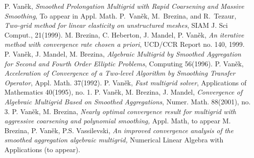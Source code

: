 \documentclass[twoside, 12pt]{article}
\begin{document}
\begin{thebibliography}{10}
{\sc P. Van\v{e}k},
{\em Smoothed Prolongation Multigrid with Rapid Coarsening and Massive
Smoothing},
To appear in Appl. Math.
{\sc P.~Van\v{e}k, M.~Brezina, and R.~Tezaur},
{\em Two-grid method for linear elasticity on unstructured meshes},
SIAM J. Sci Comput., 21(1999).
{\sc M. Brezina, C. Heberton, J. Mandel, P. Van\v{e}k},
{\em An iterative method with convergence rate chosen a priori},
UCD/CCR Report no. 140, 1999.
{\sc P. Van\v{e}k, J. Mandel, M. Brezina},
{\em Algebraic Multigrid by Smoothed Aggregation for Second and Fourth Order
Elliptic Problems},
Computing 56(1996).
{\sc P. Van\v{e}k},
{\em Acceleration of Convergence of a Two-level Algorithm by Smoothing
Transfer Operator},
Appl. Math. 37(1992).
{\sc P. Van\v{e}k},
{\em Fast multigrid solver},
Applications of Mathematics 40(1995), no. 1.
{\sc P. Van\v{e}k, M. Brezina, J. Mandel},
{\em Convergence of Algebraic Multigrid Based on Smoothed Aggregations},
Numer. Math. 88(2001), no. 3.
{\sc P. Van\v{e}k, M. Brezina},
{\it Nearly optimal convergence result for multigrid with aggressive
coarsening and polynomial smoothing,} Appl. Math, to appear
{\sc M. Brezina, P. Van\v{e}k, P.S. Vassilevski,}
{\it An improved convergence analysis of the smoothed aggregation
algebraic multigrid,}
Numerical  Linear Algebra with Applications (to appear).

\end{thebibliography}
\end{document}
